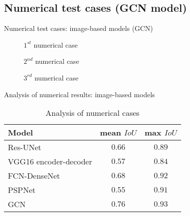 \documentclass[10pt,aspectratio=169,dvipsnames]{beamer} %
\begin{document}
\subsection{Numerical test cases (GCN model)}
\setcounter{subfigure}{0}
\begin{frame}{Numerical test cases: image-based models (GCN)}
	\begin{minipage}[c]{0.32\textwidth}
		\begin{figure}[c]
			\centering
			\caption{\(1^{st}\) numerical case}
		\end{figure}
	\end{minipage}
	\hfill
	\begin{minipage}[c]{0.32\textwidth}
		\begin{figure}[c]
			\centering
			\caption{\(2^{nd}\) numerical case}
		\end{figure}
	\end{minipage}
	\hfill
	\begin{minipage}[c]{0.32\textwidth}
		\begin{figure}[c]
			\centering
			\caption{\(3^{rd}\) numerical case}
		\end{figure}
	\end{minipage}
\end{frame}
\begin{frame}{Analysis of numerical results: image-based models}
	\begin{table}[ht!]
		\centering
		\caption{Analysis of numerical cases}
		\label{tab:table_all_numerical_cases}	
		\begin{tabular}{lcc}
			\toprule
			Model & mean \(IoU\) & max \(IoU\) \\ 
			\midrule 
			Res-UNet & \(0.66\) & \(0.89\) \\ 
			VGG16 encoder-decoder & \(0.57\) & \(0.84\) \\ 
			FCN-DenseNet & \(0.68\) & \(0.92\) \\ 
			PSPNet & \(0.55\) & \(0.91\) \\ 
			GCN & \(0.76\) & \(0.93\) \\ 
			\bottomrule
		\end{tabular}
	\end{table}
\end{frame}
\setcounter{subfigure}{0}
\end{document}
